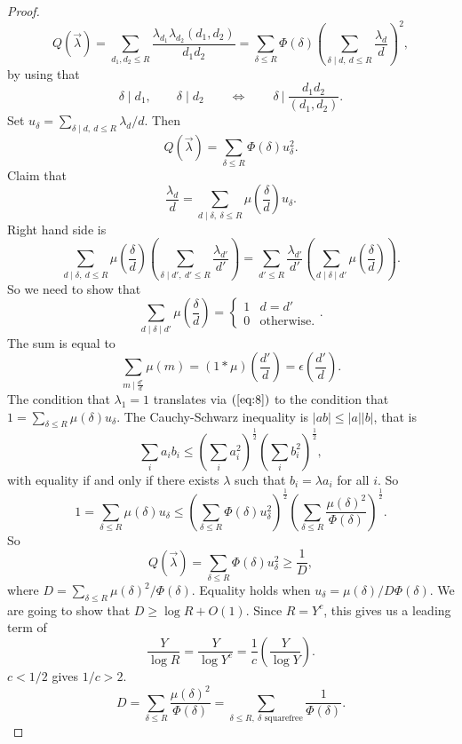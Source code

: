 \documentclass{article}
\newcommand{\rb}[1]{\left( #1 \right)}
\newcommand{\abs}[1]{\left\lvert #1 \right\rvert}
\theoremstyle{definition}\newtheorem{definition}{Definition}
\theoremstyle{definition}\newtheorem{remark}[definition]{Remark}
\theoremstyle{definition}\newtheorem*{example}{Example}
\theoremstyle{definition}\newtheorem*{note}{Note}
\begin{document}
\begin{proof}
$$ Q\rb{\overrightarrow{\lambda}} = \sum_{d_1, d_2 \le R} \dfrac{\lambda_{d_1}\lambda_{d_2}\rb{d_1, d_2}}{d_1d_2} = \sum_{\delta \le R} \Phi\rb{\delta}\rb{\sum_{\delta \mid d, \ d \le R} \dfrac{\lambda_d}{d}}^2, $$
by using that
$$ \delta \mid d_1, \qquad \delta \mid d_2 \qquad \iff \qquad \delta \ \Bigg| \ \dfrac{d_1d_2}{\rb{d_1, d_2}}. $$
Set $ u_\delta = \sum_{\delta \mid d, \ d \le R} \lambda_d / d $.
Then
$$ Q\rb{\overrightarrow{\lambda}} = \sum_{\delta \le R} \Phi\rb{\delta}u_\delta^2. $$
Claim that
\begin{equation}
\label{eq:8}
\dfrac{\lambda_d}{d} = \sum_{d \mid \delta, \ \delta \le R} \mu\rb{\dfrac{\delta}{d}}u_\delta.
\end{equation}
Right hand side is
$$ \sum_{d \mid \delta, \ d \le R} \mu\rb{\dfrac{\delta}{d}}\rb{\sum_{\delta \mid d', \ d' \le R} \dfrac{\lambda_{d'}}{d'}} = \sum_{d' \le R} \dfrac{\lambda_{d'}}{d'}\rb{\sum_{d \mid \delta \mid d'} \mu\rb{\dfrac{\delta}{d}}}. $$
So we need to show that
$$ \sum_{d \mid \delta \mid d'} \mu\rb{\dfrac{\delta}{d}} = \begin{cases}
1 & d = d' \\
0 & \text{otherwise}.
\end{cases}. $$
The sum is equal to
$$ \sum_{m \ \Big| \  \tfrac{d'}{d}} \mu\rb{m} = \rb{1 * \mu}\rb{\dfrac{d'}{d}} = \epsilon\rb{\dfrac{d'}{d}}. $$
The condition that $ \lambda_1 = 1 $ translates via $ \rb{\ref{eq:8}} $ to the condition that $ 1 = \sum_{\delta \le R} \mu\rb{\delta}u_\delta $. The Cauchy-Schwarz inequality is $ \abs{ab} \le \abs{a}\abs{b} $, that is
$$ \sum_i a_ib_i \le \rb{\sum_i a_i^2}^{\tfrac{1}{2}}\rb{\sum_i b_i^2}^{\tfrac{1}{2}}, $$
with equality if and only if there exists $ \lambda $ such that $ b_i = \lambda a_i $ for all $ i $. So
$$ 1 = \sum_{\delta \le R} \mu\rb{\delta}u_\delta \le \rb{\sum_{\delta \le R}\Phi\rb{\delta}u_\delta^2}^{\tfrac{1}{2}}\rb{\sum_{\delta \le R}\dfrac{\mu\rb{\delta}^2}{\Phi\rb{\delta}}}^{\tfrac{1}{2}}. $$
So
$$ Q\rb{\overrightarrow{\lambda}} = \sum_{\delta \le R} \Phi\rb{\delta}u_\delta^2 \ge \dfrac{1}{D}, $$
where $ D = \sum_{\delta \le R} \mu\rb{\delta}^2 / \Phi\rb{\delta} $. Equality holds when $ u_\delta = \mu\rb{\delta} / D\Phi\rb{\delta} $. We are going to show that $ D \ge \log R + O\rb{1} $. Since $ R = Y^c $, this gives us a leading term of
$$ \dfrac{Y}{\log R} = \dfrac{Y}{\log Y^c} = \dfrac{1}{c}\rb{\dfrac{Y}{\log Y}}. $$
$ c < 1 / 2 $ gives $ 1 / c > 2 $.
$$ D = \sum_{\delta \le R} \dfrac{\mu\rb{\delta}^2}{\Phi\rb{\delta}} = \sum_{\delta \le R, \ \delta \text{ squarefree}} \dfrac{1}{\Phi\rb{\delta}}. $$

\end{proof}
\end{document}
